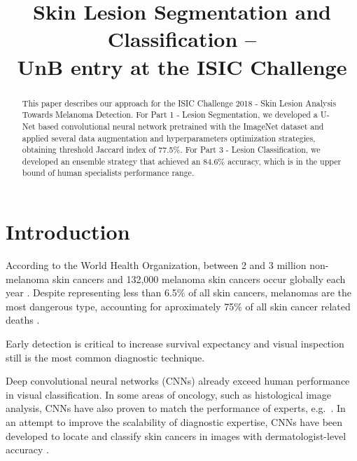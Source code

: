 \documentclass[conference]{IEEEtran}
\begin{document}
\title{Skin Lesion Segmentation and Classification --\\
  UnB entry at the ISIC Challenge}

\author{
}

\maketitle


\begin{abstract}
  This paper describes our approach for the ISIC Challenge 2018 - Skin Lesion Analysis Towards Melanoma Detection. For Part 1 - Lesion Segmentation, we developed a U-Net based convolutional neural network pretrained with the ImageNet dataset and applied several data augmentation and hyperparameters optimization strategies, obtaining threshold Jaccard index of 77.5\%. For Part 3 - Lesion Classification, we developed an ensemble strategy that achieved an 84.6\% accuracy, which is in the upper bound of human specialists performance range. 
\end{abstract}

\section{Introduction}

According to the World Health Organization, between 2 and 3 million non-melanoma skin cancers and 132,000 melanoma skin cancers occur globally each year \cite{who}. Despite representing less than 6.5\% of all skin cancers, melanomas are the most dangerous type, accounting for aproximately 75\% of all skin cancer related deaths \cite{who,nature}.

Early detection is critical to increase survival expectancy and visual inspection still is the most common diagnostic technique.

Deep convolutional neural networks (CNNs) already exceed human performance in visual classification\cite{fei}.
In some areas of oncology, such as histological image analysis, CNNs have also proven to match the performance of experts, e.g.\ \cite{veta_etal_mia2015}.
In an attempt to improve the scalability of diagnostic expertise, CNNs have been developed to locate and classify skin cancers in images with dermatologist-level accuracy \cite{nature}.
\end{document}

